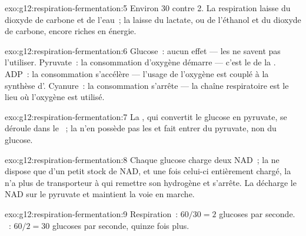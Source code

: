 \begin{solution}{exo:g12:respiration-fermentation:5}
Environ 30  contre 2. La respiration laisse du dioxyde de carbone
et de l'eau~; la  laisse du lactate, ou de l'éthanol et du
dioxyde de carbone, encore riches en énergie.
\end{solution}

\begin{solution}{exo:g12:respiration-fermentation:6}
Glucose~: aucun effet --- les  ne savent pas
l'utiliser. Pyruvate~: la consommation d'oxygène démarre --- c'est le
 de la . ADP~: la consommation
s'accélère --- l'usage de l'oxygène est couplé à la synthèse d'.
Cyanure~: la consommation s'arrête --- la chaîne respiratoire est le
lieu où l'oxygène est utilisé.
\end{solution}

\begin{solution}{exo:g12:respiration-fermentation:7}
La , qui convertit le glucose en pyruvate, se déroule dans le
~; la  n'en possède pas les  et fait
entrer du pyruvate, non du glucose.
\end{solution}

\begin{solution}{exo:g12:respiration-fermentation:8}
Chaque glucose charge deux NAD~; la  ne dispose que d'un petit
stock de NAD, et une fois celui-ci entièrement chargé, la 
n'a plus de transporteur à qui remettre son hydrogène et s'arrête. La
 décharge le NAD sur le pyruvate et maintient la voie en
marche.
\end{solution}

\begin{solution}{exo:g12:respiration-fermentation:9}
Respiration~: $60/30 = 2$ glucoses par seconde. ~:
$60/2 = 30$ glucoses par seconde, quinze fois plus.
\end{solution}


